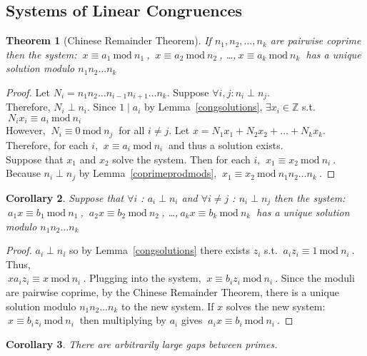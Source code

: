 \documentclass[12pt]{extarticle}
\renewcommand\qedsymbol{$\square$}
\newcommand{\divides}{\mid}
\newcommand{\Z}{\mathbb{Z}}
\newtheorem{theorem}{Theorem}[section]
\newtheorem{corollary}[theorem]{Corollary}
\newenvironment{lproof}{\begin{proof} \renewcommand{\qedsymbol}{}}{\end{proof}}
\renewcommand{\mod}[3]{\: #1 \equiv #2 \: \mathrm{mod} \: #3 \:}
\begin{document}
\subsection*{Systems of Linear Congruences}

\begin{theorem}[Chinese Remainder Theorem]
If $n_1, n_2, \dots , n_k$ are pairwise coprime then the system: $\mod{x}{a_1}{n_1}$, $\mod{x}{a_2}{n_2}$, \dots ,$\mod{x}{a_k}{n_k}$ has a unique solution modulo $n_1   n_2   \dots   n_k$
\end{theorem}

\begin{proof}
Let $N_i = n_1   n_2   \dots   n_{i-1}   n_{i+1}   \dots   n_k$. Suppose $\forall i,j : n_i \perp n_j$. \\ Therefore, $N_i \perp n_i$. Since $1 \divides a_i$ by Lemma~\ref{congsolutions}, $\exists x_i \in \Z$ s.t. $\mod{N_ix_i}{a_i}{n_i}$ \\
However, $\mod{N_i}{0}{n_j}$ for all $i \neq j$. Let $x = N_1x_1 + N_2x_2 + \dots + N_kx_k$. \\
Therefore, for each $i$, $\mod{x}{a_i}{n_i}$ and thus a solution exists. \\
Suppose that $x_1$ and $x_2$ solve the system. Then for each $i$, $\mod{x_1}{x_2}{n_i}$. \\
Because $n_i \perp n_j$ by Lemma~\ref{coprimeprodmods}, $\mod{x_1}{x_2}{n_1   n_2   \dots   n_k}$. 
\end{proof}

\begin{corollary}
Suppose that $\forall i$ : $a_i \perp n_i$ and $\forall i \neq j$ : $n_i \perp n_j$ then the system: $\mod{a_1x}{b_1}{n_1}$, $\mod{a_2x}{b_2}{n_2}$, \dots ,$\mod{a_kx}{b_k}{n_k}$ has a unique solution modulo
$n_1   n_2   \dots   n_k$
\end{corollary}

\begin{lproof}
$a_i \perp n_i$ so by Lemma~\ref{congsolutions} there exists $z_i$ s.t. $\mod{a_iz_i}{1}{n_i}$. Thus, \\ $\mod{xa_iz_i}{x}{n_i}$. Plugging into the system, $\mod{x}{b_iz_i}{n_i}$. Since the moduli are pairwise coprime, by the Chinese Remainder Theorem, there is a unique solution modulo $n_1   n_2   \dots   n_k$ to the new system. If $x$ solves the new system: $\mod{x}{b_iz_i}{n_i}$ then multiplying by $a_i$ gives $\mod{a_ix}{b_i}{n_i}$.
\end{lproof}

\begin{corollary}
There are arbitrarily large gaps between primes. 
\end{corollary}
\end{document}
